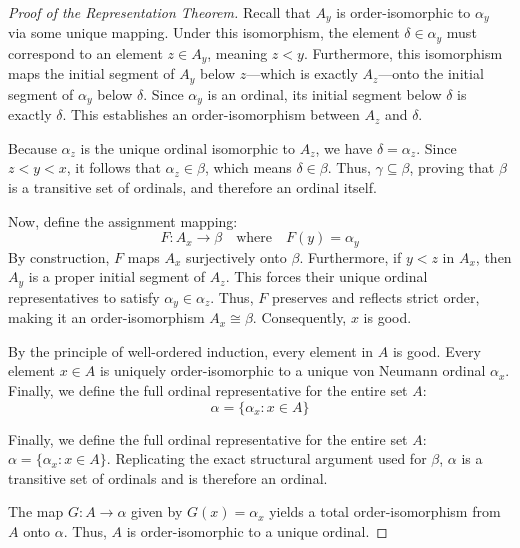 \documentclass[11pt]{article}
\begin{document}
\begin{proof}[Proof of the Representation Theorem]
Recall that $A_y$ is order-isomorphic to $\alpha_y$ via some unique mapping. Under this isomorphism, the element $\delta \in \alpha_y$ must correspond to an element $z \in A_y$, meaning $z < y$. Furthermore, this isomorphism maps the initial segment of $A_y$ below $z$—which is exactly $A_z$—onto the initial segment of $\alpha_y$ below $\delta$. Since $\alpha_y$ is an ordinal, its initial segment below $\delta$ is exactly $\delta$. This establishes an order-isomorphism between $A_z$ and $\delta$. 

Because $\alpha_z$ is the unique ordinal isomorphic to $A_z$, we have $\delta = \alpha_z$. Since $z < y < x$, it follows that $\alpha_z \in \beta$, which means $\delta \in \beta$. Thus, $\gamma \subseteq \beta$, proving that $\beta$ is a transitive set of ordinals, and therefore an ordinal itself.

Now, define the assignment mapping:
\[
F: A_x \to \beta \quad \text{where} \quad F(y) = \alpha_y
\]
By construction, $F$ maps $A_x$ surjectively onto $\beta$. Furthermore, if $y < z$ in $A_x$, then $A_y$ is a proper initial segment of $A_z$. This forces their unique ordinal representatives to satisfy $\alpha_y \in \alpha_z$. Thus, $F$ preserves and reflects strict order, making it an order-isomorphism $A_x \cong \beta$. Consequently, $x$ is good.

By the principle of well-ordered induction, every element in $A$ is good. Every element $x \in A$ is uniquely order-isomorphic to a unique von Neumann ordinal $\alpha_x$. Finally, we define the full ordinal representative for the entire set $A$:
\[
\alpha = \{\alpha_x : x \in A\}
\]

\medskip
Finally, we define the full ordinal representative for the entire set $A$: $\alpha = \{\alpha_x : x \in A\}$. Replicating the exact structural argument used for $\beta$, $\alpha$ is a transitive set of ordinals and is therefore an ordinal.


The map $G : A \to \alpha$ given by $G(x) = \alpha_x$ yields a total order-isomorphism from $A$ onto $\alpha$.
Thus, $A$ is order-isomorphic to a unique ordinal.
\end{proof}
\end{document}
